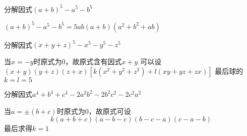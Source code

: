 \documentclass[windows,csize4,answers]{BHCexam}
\begin{document}
\begin{groups}
\begin{questions}[]
        \question[5] 分解因式$(a+b)^5-a^5-b^5$
        \begin{solution}{0.5cm}
            \methodonly $(a+b)^5-a^5-b^5=5ab(a+b)(a^2+b^2+ab)$
        \end{solution}
        \vspace{3.5cm}

        \question[5] 分解因式$(x+y+z)^5-x^5-y^5-z^5$
        \begin{solution}{0.5cm}
            \methodonly 当$x=-y$时原式为$0$，故原式含有因式$x+y$
            可以设$(x+y)(y+z)(z+x)[k(x^2+y^2+z^2)+l(xy+yz+zx)]$ 最后球的$k=l=5$
        \end{solution}
        \vspace{3.5cm}

        \question[5] 分解因式$a^4+b^4+c^4-2a^2b^2-2b^2c^2-2c^2a^2$
        \begin{solution}{0.5cm}
            \methodonly 当$a=\pm(b+c)$时原式为$0$，故原式可设
            \[
                k(a+b+c)(a-b-c)(b-c-a)(c-a-b)
            \]
            最后求得$k=1$
        \end{solution}
    \end{questions}

\end{groups}


\label{lastpage}
\end{document}
